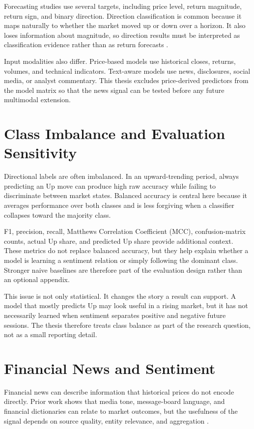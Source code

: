 Forecasting studies use several targets, including price level, return magnitude, return sign, and binary direction. Direction classification is common because it maps naturally to whether the market moved up or down over a horizon. It also loses information about magnitude, so direction results must be interpreted as classification evidence rather than as return forecasts \cite{sezer2020dlreview}.

Input modalities also differ. Price-based models use historical closes, returns, volumes, and technical indicators. Text-aware models use news, disclosures, social media, or analyst commentary. This thesis excludes price-derived predictors from the model matrix so that the news signal can be tested before any future multimodal extension.

\section{Class Imbalance and Evaluation Sensitivity}

Directional labels are often imbalanced. In an upward-trending period, always predicting an Up move can produce high raw accuracy while failing to discriminate between market states. Balanced accuracy is central here because it averages performance over both classes and is less forgiving when a classifier collapses toward the majority class.

F1, precision, recall, Matthews Correlation Coefficient (MCC), confusion-matrix counts, actual Up share, and predicted Up share provide additional context. These metrics do not replace balanced accuracy, but they help explain whether a model is learning a sentiment relation or simply following the dominant class. Stronger naive baselines are therefore part of the evaluation design rather than an optional appendix.

This issue is not only statistical. It changes the story a result can support. A model that mostly predicts Up may look useful in a rising market, but it has not necessarily learned when sentiment separates positive and negative future sessions. The thesis therefore treats class balance as part of the research question, not as a small reporting detail.

\section{Financial News and Sentiment}

Financial news can describe information that historical prices do not encode directly. Prior work shows that media tone, message-board language, and financial dictionaries can relate to market outcomes, but the usefulness of the signal depends on source quality, entity relevance, and aggregation \cite{tetlock2007media, das2007yahoo, loughran2011liability, kearney2014survey}.

